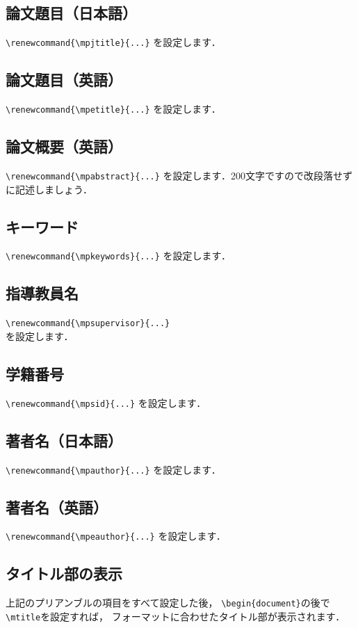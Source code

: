 \documentclass[twocolumn]{jsarticle}
\renewcommand{\mpjtitle}{修士論文概要原稿用\LaTeXe テンプレート}
\renewcommand{\mpsupervisor}{○○~○○~教授}
\renewcommand{\mpsid}{0123456}
\renewcommand{\mpauthor}{△△~△△}
\renewcommand{\mpetitle}{
  \LaTeXe\ Template File for the Proceedings of Master's Thesis 
}
\renewcommand{\mpeauthor}{Author's~Name}
\renewcommand{\mpabstract}{
  This is a \LaTeXe\ template file for the proceedings of master's thesis. 
  The abstract should appear here in grammatical, logical and plain English.
  A manuscript should be prepared in PDF format. 
  You must submit six pages in A4 size paper with a top margin of 18 mm, 
  left/right margins of 20 mm, and a bottom margin of 26 mm. 
  The title and the name of author should be printed on the first page 
  in both Japanese and English, followed by the abstract, 
  giving a brief account of the most relevant aspects of the paper. 
  Each paper must include four to five keywords 
  in order to indicate the main topics discussed in the paper 
  and to provide basic terms for indexing. 
  Main text will start with one line spacing above. 
  All figures and tables are positioned within text.
}
\renewcommand{\mpkeywords}{
  \LaTeXe\ Template, Proceedings, Master's Thesis, Dept. Mechanical Systems Engineering 
}
\begin{document}
\subsection{論文題目（日本語）}
\verb+\renewcommand{\mpjtitle}{...}+
を設定します．

\subsection{論文題目（英語）}
\verb+\renewcommand{\mpetitle}{...}+
を設定します．

\subsection{論文概要（英語）}
\verb+\renewcommand{\mpabstract}{...}+
を設定します．200文字ですので改段落せずに記述しましょう．

\subsection{キーワード}
\verb+\renewcommand{\mpkeywords}{...}+
を設定します．

\subsection{指導教員名}
\verb+\renewcommand{\mpsupervisor}{...}+ \\
を設定します．

\subsection{学籍番号}
\verb+\renewcommand{\mpsid}{...}+
を設定します．

\subsection{著者名（日本語）}
\verb+\renewcommand{\mpauthor}{...}+
を設定します．

\subsection{著者名（英語）}
\verb+\renewcommand{\mpeauthor}{...}+
を設定します．

\subsection{タイトル部の表示}
上記のプリアンブルの項目をすべて設定した後，
\verb+\begin{document}+の後で\verb+\mtitle+を設定すれば，
フォーマットに合わせたタイトル部が表示されます．
\end{document}
